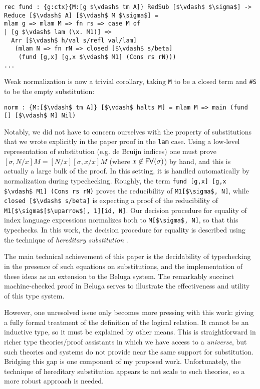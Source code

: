 \documentclass{article}
\begin{document}
\begin{lstlisting}
rec fund : {g:ctx}{M:[g $\vdash$ tm A]} RedSub [$\vdash$ $\sigma$] -> Reduce [$\vdash$ A] [$\vdash$ M $\sigma$] =
mlam g => mlam M => fn rs => case M of
| [g $\vdash$ lam (\x. M1)] =>
  Arr [$\vdash$ h/val s/refl val/lam]
   (mlam N => fn rN => closed [$\vdash$ s/beta]
    (fund [g,x] [g,x $\vdash$ M1] (Cons rs rN)))
...
\end{lstlisting}

Weak normalization is now a trivial corollary, taking \lstinline{M} to be a closed term and
\lstinline{#S} to be the empty substitution:

\begin{lstlisting}
norm : {M:[$\vdash$ tm A]} [$\vdash$ halts M] = mlam M => main (fund [] [$\vdash$ M] Nil)
\end{lstlisting}

Notably, we did not have to concern
ourselves with the property of substitutions that we wrote explicitly
in the paper proof in the \lstinline{lam} case. Using a low-level representation
of substitution (e.g. de Bruijn indices) one must prove $[\sigma,N/x]M = [N/x][\sigma,x/x]M$
(where $x \not\in \mathsf{FV}(\sigma)$) by hand, and this is actually a large
bulk of the proof. In this setting, it is handled automatically
by normalization during typechecking. Roughly, the
term \lstinline{fund [g,x] [g,x $\vdash$ M1] (Cons rs rN)} proves
the reducibility of \lstinline{M1[$\sigma$, N]}, while
\lstinline{closed [$\vdash$ s/beta]} is expecting a proof of the reducibility
of
\lstinline{M1[$\sigma$[$\uparrow$], 1][id, N]}. Our decision procedure for
equality of index language expressions normalizes both to
\lstinline{M[$\sigma$, N]}, so that this typechecks. In this work, the
decision procedure for equality is described using the technique of
\emph{hereditary substitution} \citep{Watkins02tr}. 


The main technical achievement of this paper is the decidability of
typechecking in the presence of such equations on substitutions, and
the implementation of these ideas as an extension to the Beluga system. The
remarkably succinct machine-checked proof in Beluga serves to
illustrate the effectiveness and utility of this type system. 

However, one unresolved issue only becomes more pressing with this work: giving a
fully formal treatment of the definition of the logical 
relation. It cannot be an inductive type, so it must be explained by
other means. This is straightforward in richer type theories/proof
assistants in which we have access to a \emph{universe}, but such
theories and systems do not provide near the same support for
substitution. Bridging this gap is one component of my proposed
work. Unfortunately, the technique of hereditary substitution appears
to not scale to such theories, so a more robust approach is needed.
\end{document}
